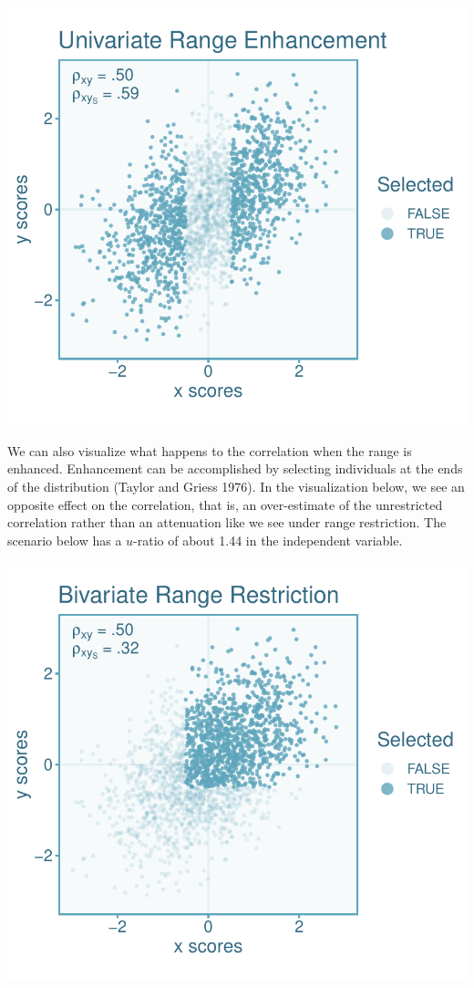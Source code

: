 \documentclass[
  letterpaper,
  DIV=11,
  numbers=noendperiod]{scrreprt}
\begin{document}
\includegraphics{indirect_range_restriction_files/figure-pdf/unnamed-chunk-3-1.pdf}

We can also visualize what happens to the correlation when the range is
enhanced. Enhancement can be accomplished by selecting individuals at
the ends of the distribution (Taylor and Griess 1976). In the
visualization below, we see an opposite effect on the correlation, that
is, an over-estimate of the unrestricted correlation rather than an
attenuation like we see under range restriction. The scenario below has
a \(u\)-ratio of about 1.44 in the independent variable.

\includegraphics{indirect_range_restriction_files/figure-pdf/unnamed-chunk-4-1.pdf}
\end{document}
